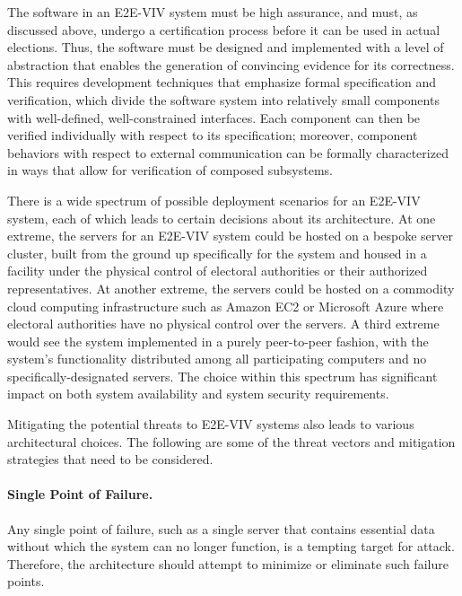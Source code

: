The software in an E2E-VIV system must be high assurance, and must, as
discussed above, undergo a certification process before it can be used
in actual elections. Thus, the software must be designed and
implemented with a level of abstraction that enables the generation of
convincing evidence for its correctness. This requires development
techniques that emphasize formal specification and verification, which
divide the software system into relatively small components with
well-defined, well-constrained interfaces. Each component can then be
verified individually with respect to its specification; moreover,
component behaviors with respect to external communication can be
formally characterized in ways that allow for verification of composed
subsystems.


There is a wide spectrum of possible deployment scenarios for an
E2E-VIV system, each of which leads to certain decisions about its
architecture. At one extreme, the servers for an E2E-VIV system could
be hosted on a bespoke server cluster, built from the ground up
specifically for the system and housed in a facility under the
physical control of electoral authorities or their authorized
representatives. At another extreme, the servers could be hosted on a
commodity cloud computing infrastructure such as Amazon EC2 or
Microsoft Azure where electoral authorities have no physical control
over the servers. A third extreme would see the system implemented in
a purely peer-to-peer fashion, with the system's functionality
distributed among all participating computers and no
specifically-designated servers. The choice within this spectrum has
significant impact on both system availability and system security
requirements.

\label{sec:threats}

Mitigating the potential threats to E2E-VIV systems also leads to
various architectural choices. The following are some of the threat
vectors and mitigation strategies that need to be considered.

\paragraph {Single Point of Failure.} Any single point of failure,
such as a single server that contains essential data without which the
system can no longer function, is a tempting target for
attack. Therefore, the architecture should attempt to minimize or
eliminate such failure points.

